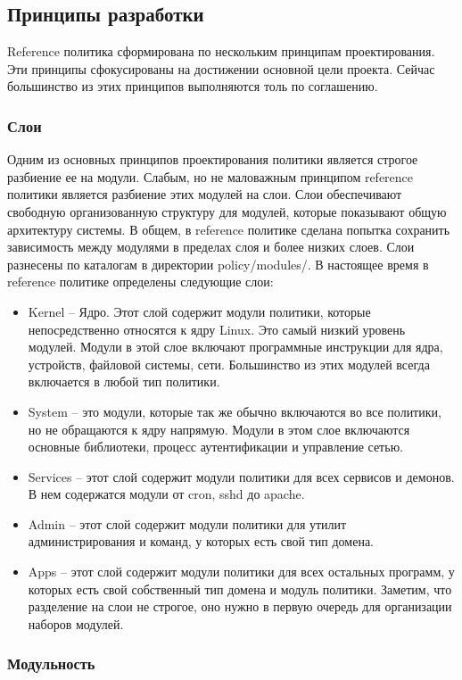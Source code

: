 \documentclass{./../class/UIR}
\begin{document}
	\subsection{Принципы разработки}
	Reference политика сформирована по нескольким принципам проектирования. Эти
	принципы сфокусированы на достижении основной цели проекта. Сейчас большинство
	 из этих принципов выполняются толь по соглашению. 
	 \subsubsection{Слои}
	Одним из основных принципов проектирования политики является строгое разбиение
	ее на модули. Слабым, но не маловажным принципом reference политики является
	разбиение этих модулей на слои. Слои обеспечивают свободную организованную
	структуру для модулей, которые показывают общую архитектуру системы.
	В общем,  в reference политике сделана попытка сохранить зависимость между
	модулями в пределах слоя и более низких слоев. Слои разнесены по каталогам в
	директории policy/modules/. В настоящее время в reference политике определены
	следующие слои:
	\begin{itemize}
	\item Kernel – Ядро. Этот слой содержит модули политики, которые
	непосредственно относятся к ядру Linux. Это самый низкий уровень модулей. Модули
	 в этой слое включают программные инструкции для ядра, устройств, файловой системы,
	  сети. Большинство из этих модулей всегда включается в любой тип политики.
	\item System – это модули, которые так же обычно включаются во все политики, но
	не обращаются к ядру напрямую. Модули в этом слое включаются основные
	библиотеки, процесс аутентификации и управление сетью.
	\item Services – этот слой содержит модули политики для всех сервисов и
	демонов.
	В нем содержатся модули от cron, sshd  до apache.
	\item Admin – этот слой содержит модули политики для утилит администрирования и
	команд, у которых есть свой тип домена.
	\item Apps – этот слой содержит модули политики для всех остальных программ, у
	которых есть свой собственный тип домена и модуль политики.
	Заметим, что разделение на слои не строгое, оно нужно в первую очередь для
	организации наборов модулей.
	\end{itemize} 
	
	\subsubsection{Модульность}
	
\end{document}
